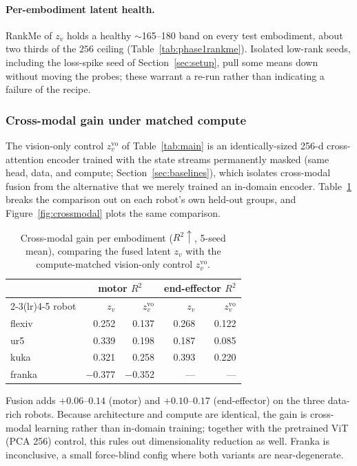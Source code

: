 \documentclass{article}
\begin{document}
\paragraph{Per-embodiment latent health.} RankMe of $z_v$ holds a healthy $\sim$165--180 band on every test embodiment, about two thirds of the $256$ ceiling (Table~\ref{tab:phase1rankme}). Isolated low-rank seeds, including the loss-spike seed of Section~\ref{sec:setup}, pull some means down without moving the probes; these warrant a re-run rather than indicating a failure of the recipe.

\subsubsection{Cross-modal gain under matched compute}
The vision-only control $z_v^{\mathrm{vo}}$ of Table~\ref{tab:main} is an identically-sized 256-d cross-attention encoder trained with the state streams permanently masked (same head, data, and compute; Section~\ref{sec:baselines}), which isolates cross-modal fusion from the alternative that we merely trained an in-domain encoder. Table~\ref{tab:crossmodal} breaks the comparison out on each robot's own held-out groups, and Figure~\ref{fig:crossmodal} plots the same comparison.

\begin{table}[h]
  \centering
  \small
  \caption{Cross-modal gain per embodiment ($R^2\uparrow$, 5-seed mean), comparing the fused latent $z_v$ with the compute-matched vision-only control $z_v^{\mathrm{vo}}$.}
  \label{tab:crossmodal}
  \begin{tabular}{lrrrr}
    \toprule
    & \multicolumn{2}{c}{motor $R^2$} & \multicolumn{2}{c}{end-effector $R^2$} \\
    \cmidrule(lr){2-3}\cmidrule(lr){4-5}
    robot & $z_v$ & $z_v^{\mathrm{vo}}$ & $z_v$ & $z_v^{\mathrm{vo}}$ \\
    \midrule
    flexiv & 0.252 & 0.137 & 0.268 & 0.122 \\
    ur5    & 0.339 & 0.198 & 0.187 & 0.085 \\
    kuka   & 0.321 & 0.258 & 0.393 & 0.220 \\
    franka & $-$0.377 & $-$0.352 & --- & --- \\
    \bottomrule
  \end{tabular}
\end{table}

\noindent Fusion adds $+0.06$--$0.14$ (motor) and $+0.10$--$0.17$ (end-effector) on the three data-rich robots. Because architecture and compute are identical, the gain is cross-modal learning rather than in-domain training; together with the pretrained ViT (PCA 256) control, this rules out dimensionality reduction as well. Franka is inconclusive, a small force-blind config where both variants are near-degenerate.
\end{document}
